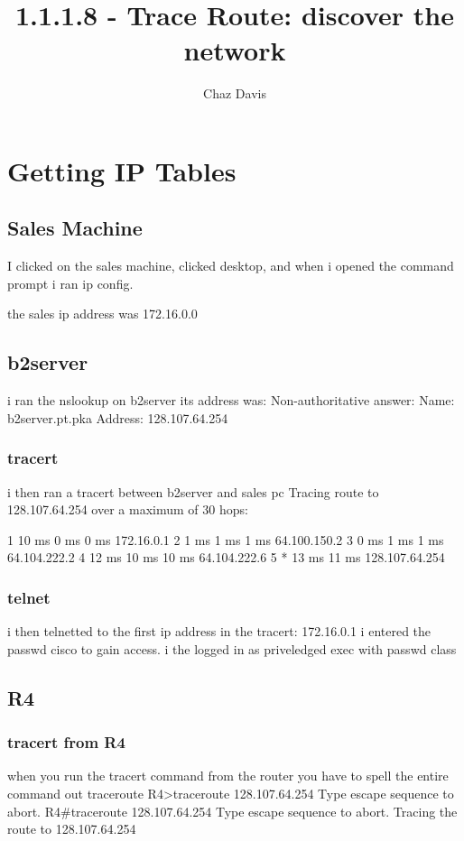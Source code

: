 


\title{1.1.1.8 - Trace Route: discover the network}

\author{Chaz Davis}

\maketitle

\section{Getting IP Tables}
\subsection{Sales Machine}
I clicked on the sales machine, clicked desktop, and when i opened the command prompt i ran ip config.

the sales ip address was 172.16.0.0
\subsection{b2server}
i ran the nslookup on b2server
its address was:
Non-authoritative answer:
Name:   b2server.pt.pka
Address:   128.107.64.254
\subsubsection{tracert}
i then ran a tracert between b2server and sales pc
Tracing route to 128.107.64.254 over a maximum of 30 hops: 

  1   10 ms     0 ms      0 ms      172.16.0.1
  2   1 ms      1 ms      1 ms      64.100.150.2
  3   0 ms      1 ms      1 ms      64.104.222.2
  4   12 ms     10 ms     10 ms     64.104.222.6
  5   *         13 ms     11 ms     128.107.64.254

\subsubsection{telnet}
i then telnetted to the first ip address in the tracert: 172.16.0.1
i entered the passwd cisco to gain access. i the logged in as priveledged exec with passwd class

\subsection{R4}
\subsubsection{tracert from R4}
when you run the tracert command from the router you have to spell the entire command out traceroute
R4>traceroute 128.107.64.254
Type escape sequence to abort.
R4#traceroute 128.107.64.254
Type escape sequence to abort.
Tracing the route to 128.107.64.254

